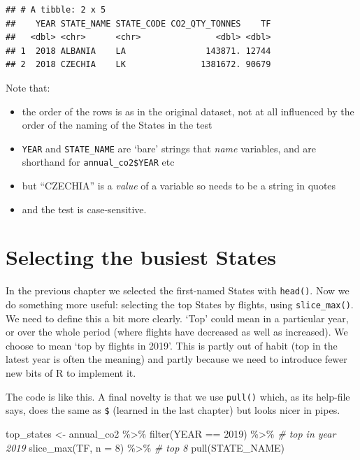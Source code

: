 \documentclass[
]{book}
\newenvironment{Shaded}{\begin{snugshade}}{\end{snugshade}}
\newcommand{\AttributeTok}[1]{\textcolor[rgb]{0.77,0.63,0.00}{#1}}
\newcommand{\CommentTok}[1]{\textcolor[rgb]{0.56,0.35,0.01}{\textit{#1}}}
\newcommand{\DecValTok}[1]{\textcolor[rgb]{0.00,0.00,0.81}{#1}}
\newcommand{\FunctionTok}[1]{\textcolor[rgb]{0.00,0.00,0.00}{#1}}
\newcommand{\NormalTok}[1]{#1}
\newcommand{\OtherTok}[1]{\textcolor[rgb]{0.56,0.35,0.01}{#1}}
\newcommand{\SpecialCharTok}[1]{\textcolor[rgb]{0.00,0.00,0.00}{#1}}
\providecommand{\tightlist}{%
  \setlength{\itemsep}{0pt}\setlength{\parskip}{0pt}}
\begin{document}
\begin{verbatim}
## # A tibble: 2 x 5
##    YEAR STATE_NAME STATE_CODE CO2_QTY_TONNES    TF
##   <dbl> <chr>      <chr>               <dbl> <dbl>
## 1  2018 ALBANIA    LA                143871. 12744
## 2  2018 CZECHIA    LK               1381672. 90679
\end{verbatim}

Note that:

\begin{itemize}
\tightlist
\item
  the order of the rows is as in the original dataset, not at all influenced by the order of the naming of the States in the test
\item
  \texttt{YEAR} and \texttt{STATE\_NAME} are `bare' strings that \emph{name} variables, and are shorthand for \texttt{annual\_co2\$YEAR} etc
\item
  but ``CZECHIA'' is a \emph{value} of a variable so needs to be a string in quotes
\item
  and the test is case-sensitive.
\end{itemize}

\hypertarget{topStates}{%
\section{Selecting the busiest States}\label{topStates}}

In the previous chapter we selected the first-named States with \texttt{head()}. Now we do something more useful: selecting the top States by flights, using \texttt{slice\_max()}. We need to define this a bit more clearly. `Top' could mean in a particular year, or over the whole period (where flights have decreased as well as increased). We choose to mean `top by flights in 2019'. This is partly out of habit (top in the latest year is often the meaning) and partly because we need to introduce fewer new bits of R to implement it.

The code is like this. A final novelty is that we use \texttt{pull()} which, as its help-file says, does the same as \texttt{\$} (learned in the last chapter) but looks nicer in pipes.

\begin{Shaded}
\begin{Highlighting}[]
\NormalTok{top\_states }\OtherTok{\textless{}{-}}\NormalTok{ annual\_co2 }\SpecialCharTok{\%\textgreater{}\%} 
  \FunctionTok{filter}\NormalTok{(YEAR }\SpecialCharTok{==} \DecValTok{2019}\NormalTok{) }\SpecialCharTok{\%\textgreater{}\%}     \CommentTok{\# top in year 2019}
  \FunctionTok{slice\_max}\NormalTok{(TF, }\AttributeTok{n =} \DecValTok{8}\NormalTok{) }\SpecialCharTok{\%\textgreater{}\%}  \CommentTok{\# top 8 }
  \FunctionTok{pull}\NormalTok{(STATE\_NAME) }
\end{Highlighting}
\end{Shaded}
\end{document}
